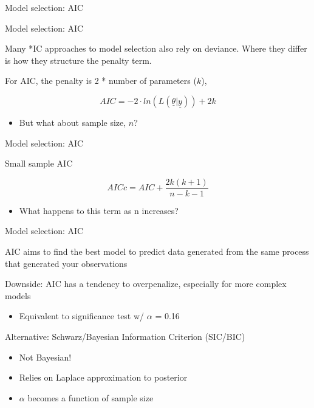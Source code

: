 \documentclass[ignorenonframetext,]{beamer}
\providecommand{\tightlist}{%
  \setlength{\itemsep}{0pt}\setlength{\parskip}{0pt}}
\begin{document}
\begin{frame}[fragile]
\begin{block}{Model selection: AIC}
\end{block}

\begin{block}{Model selection: AIC}

Many *IC approaches to model selection also rely on deviance. Where they
differ is how they structure the penalty term.

For AIC, the penalty is 2 * number of parameters (\(k\)),

\[AIC = -2\cdot ln\left( L(\underline { \theta } |\underline { y  } ) \right) + 2k\]

\begin{itemize}
\tightlist
\item
  But what about sample size, \(n\)?
\end{itemize}

\end{block}

\begin{block}{Model selection: AIC}

Small sample AIC

\[AICc=AIC+\frac { 2k(k+1) }{ n-k-1 }\]

\begin{itemize}
\tightlist
\item
  What happens to this term as n increases?
\end{itemize}

\end{block}

\begin{block}{Model selection: AIC}

AIC aims to find the best model to predict data generated from the same
process that generated your observations

Downside: AIC has a tendency to overpenalize, especially for more
complex models

\begin{itemize}
\tightlist
\item
  Equivalent to significance test w/ \(\alpha\) = 0.16
\end{itemize}

Alternative: Schwarz/Bayesian Information Criterion (SIC/BIC)

\begin{itemize}
\tightlist
\item
  Not Bayesian!
\item
  Relies on Laplace approximation to posterior
\item
  \(\alpha\) becomes a function of sample size
\end{itemize}


\end{block}
\end{frame}
\end{document}
